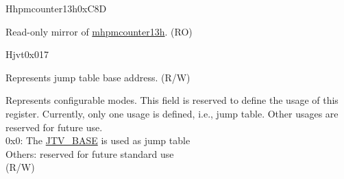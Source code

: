 \begin{register}{H}{hpmcounter13h}{0xC8D}\label{regdesc:HPMCOUNTER13H}
%
\regnewline%
\begin{regdesc}\begin{reglist}
\label{fielddesc:HPMCOUNTER13H}\item [HPMCOUNTER13H] Read-only mirror of \hyperref[regdesc:MHPMCOUNTER13H]{mhpmcounter13h}.  (RO)
\end{reglist}\end{regdesc}
\end{register}




\begin{register}{H}{jvt}{0x017}\label{regdesc:JVT}%
%
%
\regnewline%
\begin{regdesc}\begin{reglist}
\label{fielddesc:JVT_BASE}\item [BASE] Represents jump table base address. (R/W)
\label{fielddesc:JVT_MODE}\item [MODE] Represents configurable modes. This field is reserved to define the usage of this register. Currently, only one usage is defined, i.e., jump table. Other usages are reserved for future use.\\
0x0: The \hyperref[fielddesc:JVT_BASE]{JTV\_BASE} is used as jump table \\
Others: reserved for future standard use \\
(R/W)
\end{reglist}\end{regdesc}
\end{register}

